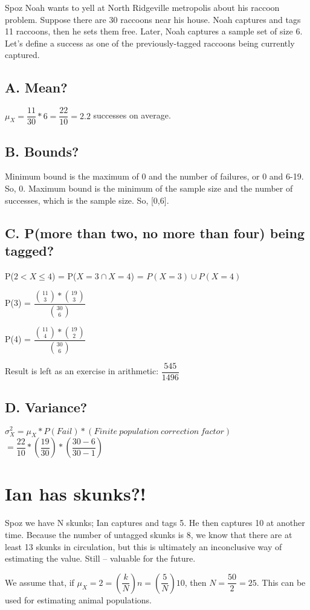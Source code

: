 \documentclass[]{article}
\begin{document}
		Spoz Noah wants to yell at North Ridgeville metropolis about his raccoon problem. Suppose there are 30 raccoons near his house. Noah captures and tags 11 raccoons, then he sets them free. Later, Noah captures a sample set of size 6. Let's define a success as one of the previously-tagged raccoons being currently captured.
		
		\subsection{A. Mean?}
			$\mu_X = \dfrac{11}{30}*6 = \dfrac{22}{10} = 2.2$ successes on average.
		
		\subsection{B. Bounds?}
			Minimum bound is the maximum of 0 and the number of failures, or 0 and 6-19. So, 0. Maximum bound is the minimum of the sample size and the number of successes, which is the sample size. So, [0,6].
		
		\subsection{C. P(more than two, no more than four) being tagged?}
		
			P($2<X\leq 4$) = P($X=3 \cap X=4$) = $P(X=3) \cup P(X=4)$
			
			P(3) = $\dfrac{\binom{11}{3} * \binom{19}{3}}{\binom{30}{6}}$
			
			P(4) = $\dfrac{\binom{11}{4} * \binom{19}{2}}{\binom{30}{6}}$
			
			Result is left as an exercise in arithmetic: $\dfrac{545}{1496}$
		
		\subsection{D. Variance?}
			$\sigma_X^2 = \mu_X * P(Fail) * (Finite\ population\ correction\ factor)$
			$ = \dfrac{22}{10} * (\dfrac{19}{30}) * (\dfrac{30-6}{30-1})$
		
	
	
	\section{Ian has skunks?!}
		Spoz we have N skunks; Ian captures and tags 5. He then captures 10 at another time. Because the number of untagged skunks is 8, we know that there are at least 13 skunks in circulation, but this is ultimately an inconclusive way of estimating the value. Still -- valuable for the future.
	
		We assume that, if $\mu_X = 2 = (\dfrac{k}{N})n = (\dfrac{5}{N})10$, then $N = \dfrac{50}{2} = 25$. This can be used for estimating animal populations.
	
\end{document}
